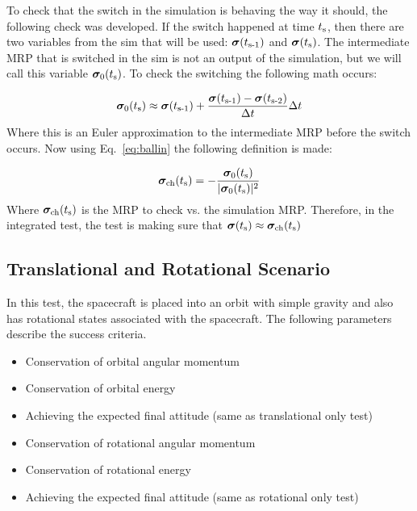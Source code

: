 To check that the switch in the simulation is behaving the way it should, the following check was developed. If the switch happened at time $t_\textnormal{s}$, then there are two variables from the sim that will be used: $\bm \sigma(t_\textnormal{s-1})$ and $\bm \sigma(t_\textnormal{s})$. The intermediate MRP that is switched in the sim is not an output of the simulation, but we will call this variable $\bm \sigma_0(t_\textnormal{s})$. To check the switching the following math occurs: 

\begin{equation}
\bm \sigma_0(t_\textnormal{s}) \approx \bm \sigma(t_\textnormal{s-1}) + \frac{\bm \sigma(t_\textnormal{s-1}) - \bm \sigma(t_\textnormal{s-2})}{\Delta t} \Delta t
\end{equation}
Where this is an Euler approximation to the intermediate MRP before the switch occurs. Now using Eq.~\eqref{eq:ballin} the following definition is made:

\begin{equation}
\bm \sigma_{\textnormal{ch}}(t_\textnormal{s}) = - \frac{\bm \sigma_0(t_\textnormal{s})}{\vert \bm \sigma_0(t_\textnormal{s}) \vert^2}
\end{equation}
Where $\bm \sigma_{\textnormal{ch}}(t_\textnormal{s})$ is the MRP to check vs. the simulation MRP. Therefore, in the integrated test, the test is making sure that $ \bm \sigma(t_\textnormal{s}) \approx \bm \sigma_{\textnormal{ch}}(t_\textnormal{s})$

\subsection{Translational and Rotational Scenario}
In this test, the spacecraft is placed into an orbit with simple gravity and also has rotational states associated with the spacecraft. The following parameters describe the success criteria.
\begin{itemize}
	\item Conservation of orbital angular momentum
	\item Conservation of orbital energy
	\item Achieving the expected final attitude (same as translational only test)
	\item Conservation of rotational angular momentum
	\item Conservation of rotational energy
	\item Achieving the expected final attitude (same as rotational only test)
\end{itemize}

